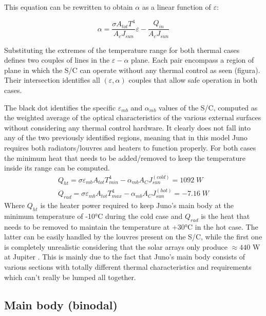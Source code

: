 This equation can be rewritten to obtain $\alpha$ as a linear function of $\varepsilon$:

\begin{equation}
    \alpha = \frac{\sigma A_{tot} T^4}{A_c J_{sun}}\varepsilon - \frac{Q_{in}}{A_c J_{sun}}
    \label{eq:eps_alpha_relation}
\end{equation}

Substituting the extremes of the temperature range for both thermal cases defines two couples of lines in the $\varepsilon-\alpha$ plane. Each pair encompass a region of plane in which the S/C can operate without any thermal control as seen \mref (figura). Their intersection identifies all $(\varepsilon, \alpha)$ couples that allow safe operation in both cases.


The black dot identifies the specific $\varepsilon_{mb}$ and $\alpha_{mb}$ values of the S/C, computed as the weighted average of the optical characteristics of the various external surfaces without considering any thermal control hardware. It clearly does not fall into any of the two previously identified regions, meaning that in this model Juno requires both radiators/louvres and heaters to function properly.
For both cases the minimum heat that needs to be added/removed to keep the temperature inside its range can be computed.
\begin{gather}
    Q_{ht} = \sigma \varepsilon_{mb} A_{tot} T_{min}^4 - \alpha_{mb} A_C J_{sun}^{(cold)} = 1092 \; W
    \\
    Q_{rad} = \sigma \varepsilon_{mb} A_{tot} T_{max}^4 - \alpha_{mb} A_C J_{sun}^{(hot)} = -7.16 \; W
\end{gather}
Where $Q_{ht}$ is the heater power required to keep Juno's main body at the minimum temperature of -10°C during the cold case and $Q_{rad}$ is the heat that needs to be removed to maintain the temperature at +30°C in the hot case. The latter can be easily handled by the louvres present on the S/C, while the first one is completely unrealistic considering that the solar arrays only produce $\approx 440$ W at Jupiter \mref. This is mainly due to the fact that Juno's main body consists of various sections with totally different thermal characteristics and requirements which can't really be lumped all together. 

\subsection{Main body (binodal)}
\label{subsec:mb_bi_sizing}

